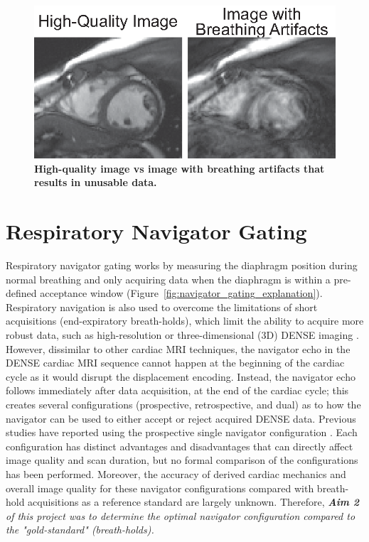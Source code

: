 	\begin{figure}
		\centering
		\includegraphics{figures/intro/good_bad_image_breathing_artifacts}
		\caption[High-quality image vs image with breathing artifacts that results in unusable data]{\textbf{High-quality image vs image with breathing artifacts that results in unusable data.}}
		\label{fig:good_bad_image_breathing_artifacts}
	\end{figure}

\section{Respiratory Navigator Gating}
	Respiratory navigator gating works by measuring the diaphragm position during normal breathing and only acquiring data when the diaphragm is within a pre-defined acceptance window (Figure~\ref{fig:navigator_gating_explanation}). Respiratory navigation is also used to overcome the limitations of short acquisitions (end-expiratory breath-holds), which limit the ability to acquire more robust data, such as high-resolution \cite{Wehner2014} or three-dimensional (3D) DENSE imaging \cite{Zhong2010a,Kar2014,Auger2012}. However, dissimilar to other cardiac MRI techniques, the navigator echo in the DENSE cardiac MRI sequence cannot happen at the beginning of the cardiac cycle as it would disrupt the displacement encoding. Instead, the navigator echo follows immediately after data acquisition, at the end of the cardiac cycle; this creates several configurations (prospective, retrospective, and dual) as to how the navigator can be used to either accept or reject acquired DENSE data. Previous studies have reported using the prospective single navigator configuration \cite{Zhong2010a,Auger2012}. Each configuration has distinct advantages and disadvantages that can directly affect image quality and scan duration, but no formal comparison of the configurations has been performed. Moreover, the accuracy of derived cardiac mechanics and overall image quality for these navigator configurations compared with breath-hold acquisitions as a reference standard are largely unknown. Therefore, \textit{\textbf{Aim 2} of this project was to determine the optimal navigator configuration compared to the "gold-standard" (breath-holds).}
	
